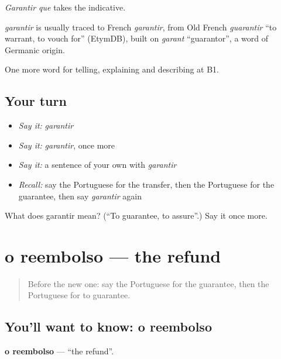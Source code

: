 \emph{Garantir que} takes the indicative.

\begin{cousinweb}
\emph{garantir} is usually traced to French \emph{garantir}, from Old French \emph{guarantir} \textquotedblleft{}to warrant, to vouch for\textquotedblright{} (EtymDB), built on \emph{garant} \textquotedblleft{}guarantor\textquotedblright{}, a word of Germanic origin.
\end{cousinweb}

\begin{grammarlens}[title={What you've built}]
One more word for telling, explaining and describing at B1.
\end{grammarlens}

\subsection*{Your turn}
\begin{itemize}
\raggedright
  \item \emph{Say it:} \emph{garantir}
  \item \emph{Say it:} \emph{garantir}, once more
  \item \emph{Say it:} a sentence of your own with \emph{garantir}
  \item \emph{Recall:} say the Portuguese for the transfer, then the Portuguese for the guarantee, then say \emph{garantir} again
\end{itemize}

\begin{tcolorbox}[breakable,colback=teal!4,colframe=teal!35!black,title={Before you move on}]
What does garantir mean? (\textquotedblleft{}To guarantee, to assure\textquotedblright{}.) Say it once more.
\end{tcolorbox}
\section[o reembolso]{o reembolso — the refund}

\label{lesson:PT-C394-reembolso}



\begin{quote}
Before the new one: say the Portuguese for the guarantee, then the Portuguese for to guarantee.
\end{quote}

\subsection*{You'll want to know: o reembolso}
\textbf{o reembolso} — \textquotedblleft{}the refund\textquotedblright{}.

